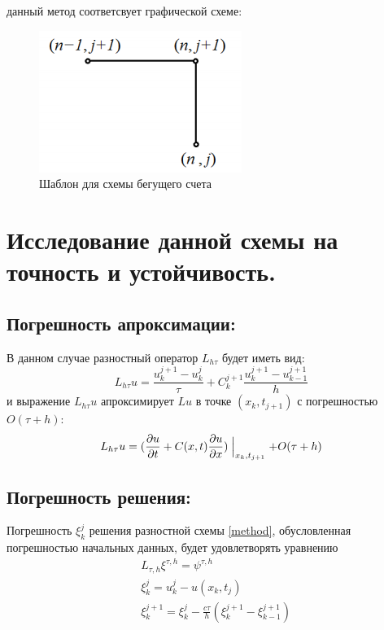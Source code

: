 \documentclass[12pt,a4paper]{scrartcl}
\begin{document}
	данный метод соответсвует графической схеме:
	\begin{figure}[h]
		\centering
		\includegraphics{method.png}
		\caption{Шаблон для схемы бегущего счета}
	\end{figure}
	\section{Исследование данной схемы на точность и устойчивость.}    
	\subsection{Погрешность апроксимации:}
	В данном случае разностный оператор $L_{h \tau}$ будет иметь вид:
	\[
	L_{h \tau}u = \frac{u^{j+1}_{k}-u^{j}_k}{\tau}+C^{j+1}_{k}\frac{u^{j+1}_{k}-u^{j+1}_{k-1}}{h}
	\]
	и выражение $L_{h \tau}u$ апроксимирует $Lu$ в точке $(x_k,t_{j+1})$ с погрешностью $O(\tau + h)$:
	\[
	L_{h \tau}u = (	\frac{\partial u}{\partial t}+C(x,t) \frac{\partial u}{\partial x})\Bigm|_{x_k,t_{j+1}}+O(\tau+h)
	\]
	
	\subsection{Погрешность решения:}
	Погрешность $\xi^j_k $ решения разностной схемы \eqref{method}, обусловленная погрешностью начальных данных, будет удовлетворять уравнению
	\begin{align*}
	&L_{\tau,h} \xi^{\tau,h} = \psi^{\tau,h}\\
	&\xi^{j}_{k} = u^{j}_k - u(x_k,t_j) \\
	&\xi^{j+1}_k = \xi^j_k - \frac{c \tau}{h}(\xi^{j+1}_k-\xi^{j+1}_{k-1})
	\end{align*}
	
\end{document}
